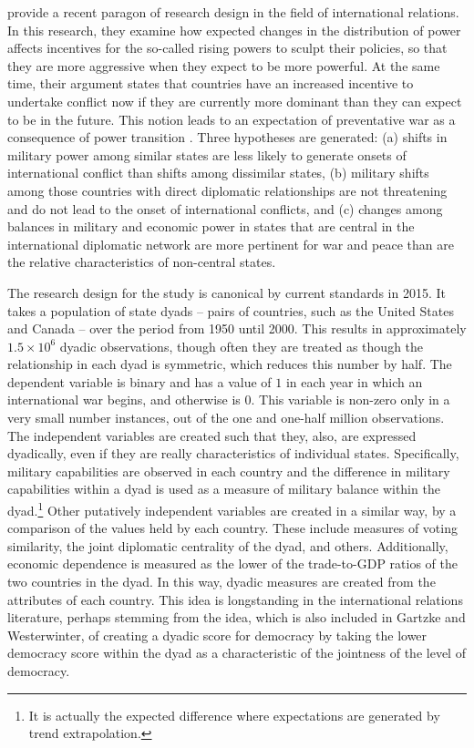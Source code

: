 \documentclass[3p,times,twocolumn,authoryear,12pt]{elsarticle}
\begin{document}
\cite{gartzke:westerwinter:2014} provide a recent paragon of research design in the field of international relations. In this research, they examine how expected changes in the distribution of power affects incentives for the so-called rising powers to sculpt their policies, so that they are more aggressive when they expect to be more powerful. At the same time, their argument states that countries have an increased incentive to undertake conflict now if they are currently more dominant than they can expect to be in the future. This notion leads to an expectation of preventative war as a consequence of power transition \citep{levy:1987}. Three hypotheses are generated: (a) shifts in military power among similar states are less likely to generate onsets of international conflict than shifts among dissimilar states, (b) military shifts among those countries with direct diplomatic relationships are not threatening and do not lead to the onset of international conflicts, and (c) changes among balances in military and economic power in states that are central in the international diplomatic network are more pertinent for war and peace than are the relative characteristics of non-central states.

The research design for the \citep{gartzke:westerwinter:2014} study is canonical by current standards in 2015. It takes a population of state dyads -- pairs of countries, such as the United States and Canada -- over the period from 1950 until 2000. This results in approximately $1.5 \times 10^6$ dyadic observations, though often they are treated as though the relationship in each dyad is symmetric, which reduces this number by half. The dependent variable is binary and has a value of $1$ in each year in which an international war begins, and otherwise is $0$. This variable is non-zero only in a very small number instances, out of the one and one-half million observations. The independent variables are created such that they, also, are expressed dyadically, even if they are really characteristics of individual states. Specifically, military capabilities are observed in each country and the difference in military capabilities within a dyad is used as a measure of military balance within the dyad.\footnote{It is actually the expected difference where expectations are generated by trend extrapolation.}  Other putatively independent variables are created in a similar way, by a comparison of the values held by each country. These include measures of voting similarity, the joint diplomatic centrality of the dyad, and others. Additionally, economic dependence is measured as the lower of the trade-to-GDP ratios of the two countries in the dyad. In this way, dyadic measures are created from the attributes of each country. This idea is longstanding in the international relations literature, perhaps stemming from the idea, which is also included in Gartzke and Westerwinter, of creating a dyadic score for democracy by taking the lower democracy score within the dyad as a characteristic of the jointness of the level of democracy. 
\end{document}
